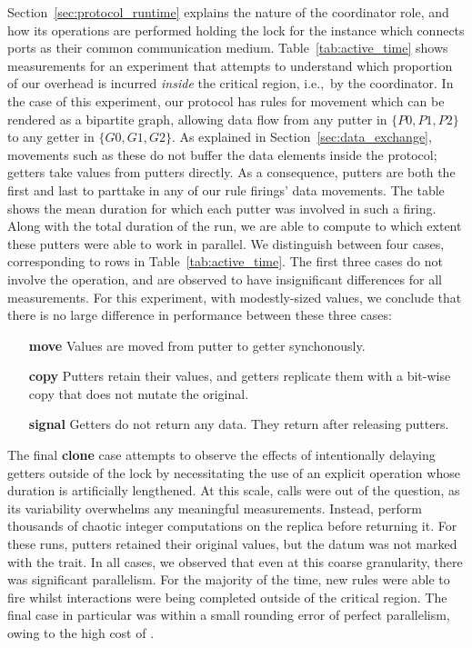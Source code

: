 Section~\ref{sec:protocol_runtime} explains the nature of the coordinator role, and how its operations are performed holding the lock for the  instance which connects ports as their common communication medium. Table~\ref{tab:active_time} shows measurements for an experiment that attempts to understand which proportion of our overhead is incurred \textit{inside} the critical region, i.e.,\ by the coordinator. In the case of this experiment, our protocol has rules for movement which can be rendered as a bipartite graph, allowing data flow from any putter in $\{P0, P1, P2\}$ to any getter in $\{G0, G1, G2\}$. As explained in Section~\ref{sec:data_exchange}, movements such as these do not buffer the data elements inside the protocol; getters take values from putters directly. As a consequence, putters are both the first and last to parttake in any of our rule firings' data movements. The table shows the mean duration for which each putter was involved in such a firing. Along with the total duration of the run, we are able to compute to which extent these putters were able to work in parallel. We distinguish between four cases, corresponding to rows in Table~\ref{tab:active_time}. The first three cases do not involve the  operation, and are observed to have insignificant differences for all measurements. For this experiment, with modestly-sized values, we conclude that there is no large difference in performance between these three cases:
\begin{enumerate}
	\item [\textbf{move}] Values are moved from putter to getter synchonously.
	\item [\textbf{copy}] Putters retain their values, and getters replicate them with a bit-wise copy that does not mutate the original.
	\item [\textbf{signal}] Getters do not return any data. They return after releasing putters.
\end{enumerate}

The final \textbf{clone} case attempts to observe the effects of intentionally delaying getters outside of the lock by necessitating the use of an explicit  operation whose duration is artificially lengthened. At this scale,  calls were out of the question, as its variability overwhelms any meaningful measurements. Instead,  perform thousands of chaotic integer computations on the replica before returning it. For these runs, putters retained their original values, but the datum was not marked with the  trait. In all cases, we observed that even at this coarse granularity, there was significant parallelism. For the majority of the time, new rules were able to fire whilst interactions were being completed outside of the critical region. The final case in particular was within a small rounding error of perfect parallelism, owing to the high cost of .

